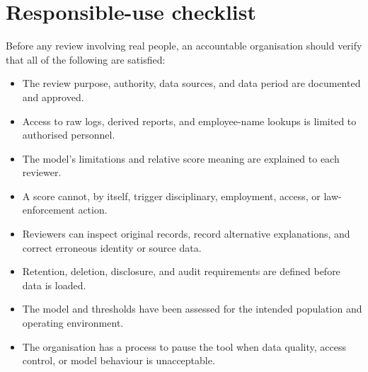 \section{Responsible-use checklist}
\label{app:responsible-use}
Before any review involving real people, an accountable organisation
should verify that all of the following are satisfied:
\begin{itemize}
  \item The review purpose, authority, data sources, and data period are
  documented and approved.
  \item Access to raw logs, derived reports, and employee-name lookups
  is limited to authorised personnel.
  \item The model's limitations and relative score meaning are
  explained to each reviewer.
  \item A score cannot, by itself, trigger disciplinary, employment,
  access, or law-enforcement action.
  \item Reviewers can inspect original records, record alternative
  explanations, and correct erroneous identity or source data.
  \item Retention, deletion, disclosure, and audit requirements are
  defined before data is loaded.
  \item The model and thresholds have been assessed for the intended
  population and operating environment.
  \item The organisation has a process to pause the tool when data
  quality, access control, or model behaviour is unacceptable.
\end{itemize}

